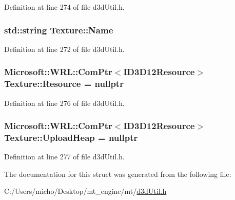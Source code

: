 Definition at line 274 of file d3d\+Util.\+h.

\subsubsection[{\texorpdfstring{Name}{Name}}]{\setlength{\rightskip}{0pt plus 5cm}std\+::string Texture\+::\+Name}\hypertarget{struct_texture_aff942a6e6a80c06965b239a73ad04a2d_aff942a6e6a80c06965b239a73ad04a2d}{}\label{struct_texture_aff942a6e6a80c06965b239a73ad04a2d_aff942a6e6a80c06965b239a73ad04a2d}


Definition at line 272 of file d3d\+Util.\+h.

\subsubsection[{\texorpdfstring{Resource}{Resource}}]{\setlength{\rightskip}{0pt plus 5cm}Microsoft\+::\+W\+R\+L\+::\+Com\+Ptr$<$I\+D3\+D12\+Resource$>$ Texture\+::\+Resource = nullptr}\hypertarget{struct_texture_ae273d56b160aa483303d13b903e00122_ae273d56b160aa483303d13b903e00122}{}\label{struct_texture_ae273d56b160aa483303d13b903e00122_ae273d56b160aa483303d13b903e00122}


Definition at line 276 of file d3d\+Util.\+h.

\subsubsection[{\texorpdfstring{Upload\+Heap}{UploadHeap}}]{\setlength{\rightskip}{0pt plus 5cm}Microsoft\+::\+W\+R\+L\+::\+Com\+Ptr$<$I\+D3\+D12\+Resource$>$ Texture\+::\+Upload\+Heap = nullptr}\hypertarget{struct_texture_a9e4e92ab08debca51ed2635cd3f9c5a7_a9e4e92ab08debca51ed2635cd3f9c5a7}{}\label{struct_texture_a9e4e92ab08debca51ed2635cd3f9c5a7_a9e4e92ab08debca51ed2635cd3f9c5a7}


Definition at line 277 of file d3d\+Util.\+h.



The documentation for this struct was generated from the following file\+:\begin{DoxyCompactItemize}
\item 
C\+:/\+Users/micho/\+Desktop/mt\+\_\+engine/mt/\hyperlink{d3d_util_8h}{d3d\+Util.\+h}\end{DoxyCompactItemize}
